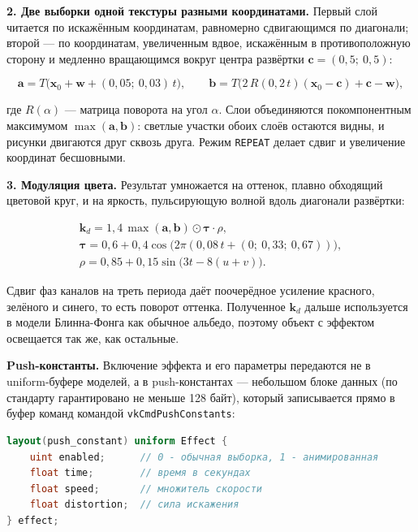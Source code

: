 \documentclass[14pt,a4paper]{extarticle}
\begin{document}
\textbf{2. Две выборки одной текстуры разными координатами.} Первый слой
читается по искажённым координатам, равномерно сдвигающимся по диагонали;
второй — по координатам, увеличенным вдвое, искажённым в противоположную
сторону и медленно вращающимся вокруг центра развёртки
$\mathbf{c} = (0{,}5;\ 0{,}5)$:

\begin{equation}
	\mathbf{a} = T\bigl(\mathbf{x}_0 + \mathbf{w} + (0{,}05;\ 0{,}03)\,t\bigr),
	\qquad
	\mathbf{b} = T\bigl(2\,R(0{,}2\,t)(\mathbf{x}_0 - \mathbf{c}) + \mathbf{c} - \mathbf{w}\bigr),
\end{equation}

где $R(\alpha)$ — матрица поворота на угол $\alpha$. Слои объединяются
покомпонентным максимумом $\max(\mathbf{a}, \mathbf{b})$: светлые участки
обоих слоёв остаются видны, и рисунки двигаются друг сквозь друга. Режим
\texttt{REPEAT} делает сдвиг и увеличение координат бесшовными.

\textbf{3. Модуляция цвета.} Результат умножается на оттенок, плавно
обходящий цветовой круг, и на яркость, пульсирующую волной вдоль диагонали
развёртки:

\begin{gather}
	\mathbf{k}_d = 1{,}4\,\max(\mathbf{a}, \mathbf{b}) \odot \boldsymbol{\tau}\cdot \rho, \\
	\boldsymbol{\tau} = 0{,}6 + 0{,}4\cos\bigl(2\pi(0{,}08\,t + (0;\ 0{,}33;\ 0{,}67))\bigr), \\
	\rho = 0{,}85 + 0{,}15\sin\bigl(3t - 8(u + v)\bigr).
\end{gather}

Сдвиг фаз каналов на треть периода даёт поочерёдное усиление красного,
зелёного и синего, то есть поворот оттенка. Полученное $\mathbf{k}_d$ дальше
используется в модели Блинна-Фонга как обычное альбедо, поэтому объект с
эффектом освещается так же, как остальные.

\textbf{Push-константы.} Включение эффекта и его параметры передаются не в
uniform-буфере моделей, а в push-константах — небольшом блоке данных (по
стандарту гарантировано не меньше 128 байт), который записывается прямо в
буфер команд командой \texttt{vkCmdPushConstants}:

\begin{lstlisting}[language=GLSL, numbers=none]
layout(push_constant) uniform Effect {
	uint enabled;      // 0 - обычная выборка, 1 - анимированная
	float time;        // время в секундах
	float speed;       // множитель скорости
	float distortion;  // сила искажения
} effect;
\end{lstlisting}
\end{document}
